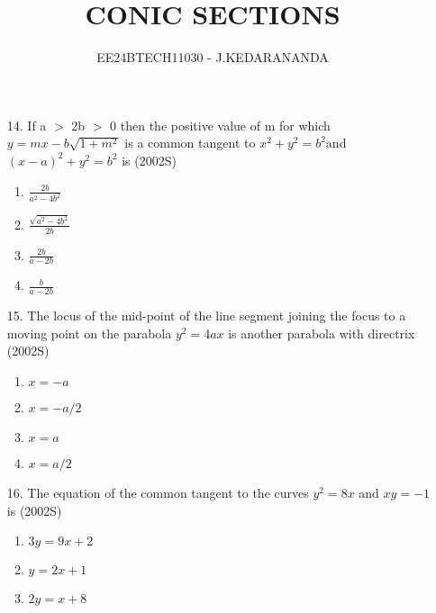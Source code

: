 \documentclass[journal,12pt,twocolumn]{IEEEtran}
\theoremstyle{remark}
\begin{document}

\vspace{3cm}

\title{CONIC SECTIONS}
\author{EE24BTECH11030 - J.KEDARANANDA}
\maketitle
\newpage
\bigskip

\renewcommand{\thefigure}{\theenumi}
\renewcommand{\thetable}{\theenumi}


\begin{enumerate}
    \item[14.] If a $>$ 2b $>$ 0 then the positive value of m for which       $y=mx-b\sqrt{1+m^{2}} $ is a common tangent to $x^{2} + y^{2} = b^{2} $and  $(x-a)^{2} + y^{2} = b^{2}$ is   \hfill {(2002S)}
\begin{enumerate}
    \item  $\frac{2b}{a^{2}-4b^{2}}$  \\
    \item $\frac{\sqrt{a^{2}-4b^{2}}}{2b}$ \\
    \item $\frac{2b}{a-2b}$  \\
    \item $\frac{b}{a-2b}$ \\
 \end{enumerate}
\item[15.] The locus of the mid-point of the line segment joining the focus to a moving point on the parabola $y^{2} = 4ax$ is another parabola with directrix \hfill{(2002S)}
\begin{enumerate}
    \item $x=-a$\\
    \item $x=-a/2$\\
    \item $x=a$\\
    \item $x=a/2$\\
\end{enumerate}
\item[16.] The equation of the common tangent to the curves $y^{2}=8x$ and $xy=-1$ is \hfill{(2002S)}
\begin{enumerate}
    \item $3y=9x+2$\\
    \item $y=2x+1$\\
    \item $2y=x+8$\\

\end{enumerate}
\end{enumerate}
\end{document}
